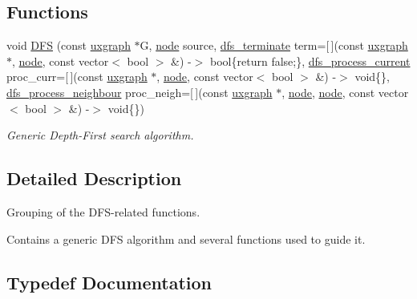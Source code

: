 \subsection*{Functions}
\begin{DoxyCompactItemize}
\item 
void \hyperlink{namespacelgraph_1_1traversal_1_1dfs_a50327c4c042329a05df9f2eb4d7f981a}{D\+FS} (const \hyperlink{classlgraph_1_1utils_1_1uxgraph}{uxgraph} $\ast$G, \hyperlink{namespacelgraph_1_1utils_a7bd66ede3805ef121bc2835bd48de0cf}{node} source, \hyperlink{namespacelgraph_1_1traversal_1_1dfs_a41b39b9a31fd3665c970a6eb70564765}{dfs\+\_\+terminate} term=\mbox{[}$\,$\mbox{]}(const \hyperlink{classlgraph_1_1utils_1_1uxgraph}{uxgraph} $\ast$, \hyperlink{namespacelgraph_1_1utils_a7bd66ede3805ef121bc2835bd48de0cf}{node}, const vector$<$ bool $>$ \&) -\/$>$ bool\{return false;\}, \hyperlink{namespacelgraph_1_1traversal_1_1dfs_a918161e9face694d4ebdc4ba13cdd5ac}{dfs\+\_\+process\+\_\+current} proc\+\_\+curr=\mbox{[}$\,$\mbox{]}(const \hyperlink{classlgraph_1_1utils_1_1uxgraph}{uxgraph} $\ast$, \hyperlink{namespacelgraph_1_1utils_a7bd66ede3805ef121bc2835bd48de0cf}{node}, const vector$<$ bool $>$ \&) -\/$>$ void\{\}, \hyperlink{namespacelgraph_1_1traversal_1_1dfs_af04d72933b75432a505b1235d173da4b}{dfs\+\_\+process\+\_\+neighbour} proc\+\_\+neigh=\mbox{[}$\,$\mbox{]}(const \hyperlink{classlgraph_1_1utils_1_1uxgraph}{uxgraph} $\ast$, \hyperlink{namespacelgraph_1_1utils_a7bd66ede3805ef121bc2835bd48de0cf}{node}, \hyperlink{namespacelgraph_1_1utils_a7bd66ede3805ef121bc2835bd48de0cf}{node}, const vector$<$ bool $>$ \&) -\/$>$ void\{\})
\begin{DoxyCompactList}\small\item\em Generic Depth-\/\+First search algorithm. \end{DoxyCompactList}\end{DoxyCompactItemize}


\subsection{Detailed Description}
Grouping of the D\+F\+S-\/related functions. 

Contains a generic D\+FS algorithm and several functions used to guide it. 

\subsection{Typedef Documentation}
